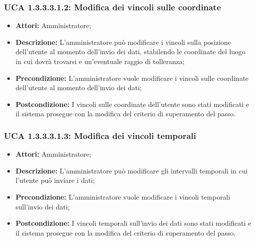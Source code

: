 \hypertarget{A1.3.3.3.1.2}{}
\subsubsection{UCA 1.3.3.3.1.2: Modifica dei vincoli sulle coordinate}
\begin{itemize}
\item \textbf{Attori:}
 Amministratore;
\item \textbf{Descrizione:} 
L'amministratore può modificare i vincoli sulla posizione dell'utente al momento dell'invio dei dati, stabilendo le coordinate del luogo in cui dovrà trovarsi e un'eventuale raggio di tolleranza;
\item \textbf{Precondizione:} 
L'amministratore vuole modificare i vincoli sulle coordinate dell'utente al momento dell'invio dei dati;
\item \textbf{Postcondizione:} 
I vincoli sulle coordinate dell'utente sono stati modificati e il sistema prosegue con la modifica del criterio di superamento del passo.
\end{itemize}

\hypertarget{A1.3.3.3.1.3}{}
\subsubsection{UCA 1.3.3.3.1.3: Modifica dei vincoli temporali}
\begin{itemize}
\item \textbf{Attori:}
 Amministratore;
\item \textbf{Descrizione:} 
L'amministratore può modificare gli intervalli temporali in cui l'utente può inviare i dati;
\item \textbf{Precondizione:} 
L'amministratore vuole modificare i vincoli temporali sull'invio dei dati;
\item \textbf{Postcondizione:} 
I vincoli temporali sull'invio dei dati sono stati modificati e il sistema prosegue con la modifica del criterio di superamento del passo.
\end{itemize}

\hypertarget{A1.3.3.3.1.4}{}
